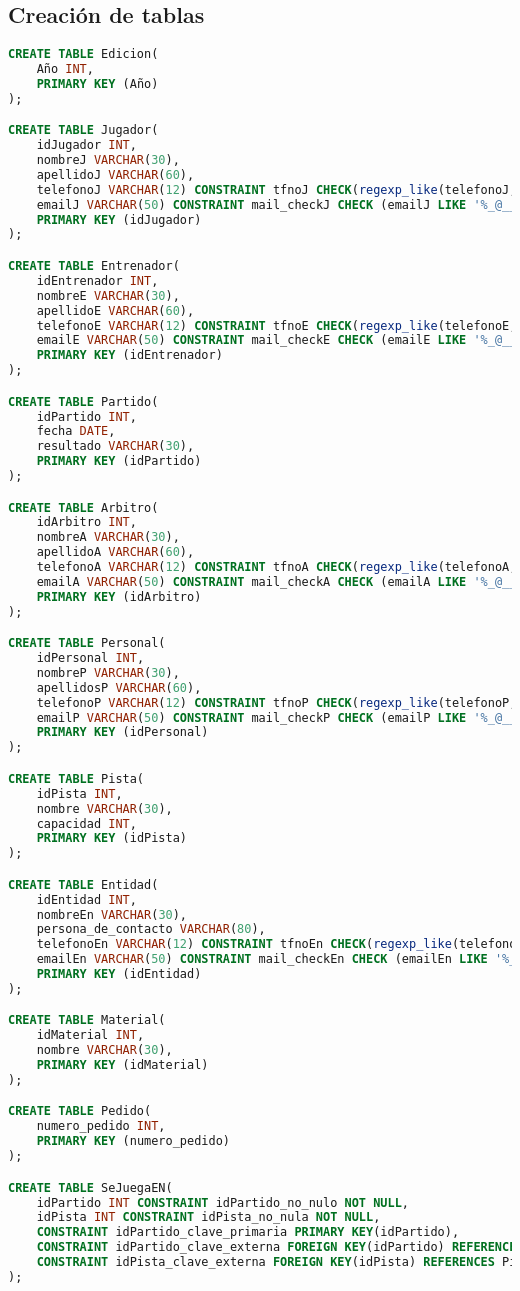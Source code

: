 \subsection{Creación de tablas}
\begin{lstlisting}[language=sql]
CREATE TABLE Edicion(
	Año INT,
	PRIMARY KEY (Año)
);

CREATE TABLE Jugador(
	idJugador INT,
	nombreJ VARCHAR(30),
	apellidoJ VARCHAR(60),
	telefonoJ VARCHAR(12) CONSTRAINT tfnoJ CHECK(regexp_like(telefonoJ,'^[/+]?[0-9]')),
	emailJ VARCHAR(50) CONSTRAINT mail_checkJ CHECK (emailJ LIKE '%_@__%.__%'),
	PRIMARY KEY (idJugador)
);

CREATE TABLE Entrenador(
	idEntrenador INT,
	nombreE VARCHAR(30),
	apellidoE VARCHAR(60),
	telefonoE VARCHAR(12) CONSTRAINT tfnoE CHECK(regexp_like(telefonoE,'^[/+]?[0-9]')),
	emailE VARCHAR(50) CONSTRAINT mail_checkE CHECK (emailE LIKE '%_@__%.__%'),
	PRIMARY KEY (idEntrenador)
);

CREATE TABLE Partido(
	idPartido INT,
	fecha DATE,
	resultado VARCHAR(30),
	PRIMARY KEY (idPartido)
);

CREATE TABLE Arbitro(
	idArbitro INT,
	nombreA VARCHAR(30),
	apellidoA VARCHAR(60),
	telefonoA VARCHAR(12) CONSTRAINT tfnoA CHECK(regexp_like(telefonoA,'^[/+]?[0-9]')),
	emailA VARCHAR(50) CONSTRAINT mail_checkA CHECK (emailA LIKE '%_@__%.__%'),
	PRIMARY KEY (idArbitro)
);

CREATE TABLE Personal(
	idPersonal INT,
	nombreP VARCHAR(30),
	apellidosP VARCHAR(60),
	telefonoP VARCHAR(12) CONSTRAINT tfnoP CHECK(regexp_like(telefonoP,'^[/+]?[0-9]')),
	emailP VARCHAR(50) CONSTRAINT mail_checkP CHECK (emailP LIKE '%_@__%.__%'),
	PRIMARY KEY (idPersonal)
);

CREATE TABLE Pista(
	idPista INT,
	nombre VARCHAR(30),
	capacidad INT,
	PRIMARY KEY (idPista)
);

CREATE TABLE Entidad(
	idEntidad INT,
	nombreEn VARCHAR(30),
	persona_de_contacto VARCHAR(80),
	telefonoEn VARCHAR(12) CONSTRAINT tfnoEn CHECK(regexp_like(telefonoEn,'^[/+]?[0-9]')),
	emailEn VARCHAR(50) CONSTRAINT mail_checkEn CHECK (emailEn LIKE '%_@__%.__%'),
	PRIMARY KEY (idEntidad)
);

CREATE TABLE Material(
	idMaterial INT,
	nombre VARCHAR(30),
	PRIMARY KEY (idMaterial)
);

CREATE TABLE Pedido(
	numero_pedido INT,
	PRIMARY KEY (numero_pedido)
);

CREATE TABLE SeJuegaEN(
	idPartido INT CONSTRAINT idPartido_no_nulo NOT NULL,
	idPista INT CONSTRAINT idPista_no_nula NOT NULL,
	CONSTRAINT idPartido_clave_primaria PRIMARY KEY(idPartido),
	CONSTRAINT idPartido_clave_externa FOREIGN KEY(idPartido) REFERENCES Partido(idPartido),
	CONSTRAINT idPista_clave_externa FOREIGN KEY(idPista) REFERENCES Pista(idPista)
);


\end{lstlisting}
